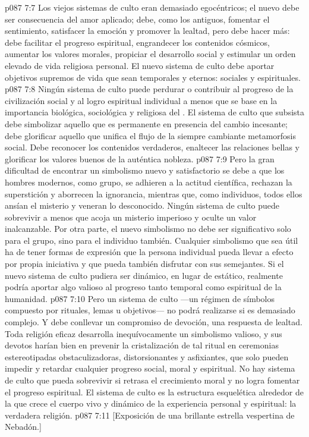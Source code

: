 \vs p087 7:7 Los viejos sistemas de culto eran demasiado egocéntricos; el nuevo debe ser consecuencia del amor aplicado; debe, como los antiguos, fomentar el sentimiento, satisfacer la emoción y promover la lealtad, pero debe hacer más: debe facilitar el progreso espiritual, engrandecer los contenidos cósmicos, aumentar los valores morales, propiciar el desarrollo social y estimular un orden elevado de vida religiosa personal. El nuevo sistema de culto debe aportar objetivos supremos de vida que sean temporales y eternos: sociales y espirituales.
\vs p087 7:8 Ningún sistema de culto puede perdurar o contribuir al progreso de la civilización social y al logro espiritual individual a menos que se base en la importancia biológica, sociológica y religiosa del . El sistema de culto que subsista debe simbolizar aquello que es permanente en presencia del cambio incesante; debe glorificar aquello que unifica el flujo de la siempre cambiante metamorfosis social. Debe reconocer los contenidos verdaderos, enaltecer las relaciones bellas y glorificar los valores buenos de la auténtica nobleza.
\vs p087 7:9 Pero la gran dificultad de encontrar un simbolismo nuevo y satisfactorio se debe a que los hombres modernos, como grupo, se adhieren a la actitud científica, rechazan la superstición y aborrecen la ignorancia, mientras que, como individuos, todos ellos ansían el misterio y veneran lo desconocido. Ningún sistema de culto puede sobrevivir a menos que acoja un misterio imperioso y oculte un valor inalcanzable. Por otra parte, el nuevo simbolismo no debe ser significativo solo para el grupo, sino para el individuo también. Cualquier simbolismo que sea útil ha de tener formas de expresión que la persona individual pueda llevar a efecto por propia iniciativa y que pueda también disfrutar con sus semejantes. Si el nuevo sistema de culto pudiera ser dinámico, en lugar de estático, realmente podría aportar algo valioso al progreso tanto temporal como espiritual de la humanidad.
\vs p087 7:10 Pero un sistema de culto ---un régimen de símbolos compuesto por rituales, lemas u objetivos--- no podrá realizarse si es demasiado complejo. Y debe conllevar un compromiso de devoción, una respuesta de lealtad. Toda religión eficaz desarrolla inequívocamente un simbolismo valioso, y sus devotos harían bien en prevenir la cristalización de tal ritual en ceremonias estereotipadas obstaculizadoras, distorsionantes y asfixiantes, que solo pueden impedir y retardar cualquier progreso social, moral y espiritual. No hay sistema de culto que pueda sobrevivir si retrasa el crecimiento moral y no logra fomentar el progreso espiritual. El sistema de culto es la estructura esquelética alrededor de la que crece el cuerpo vivo y dinámico de la experiencia personal y espiritual: la verdadera religión.
\vsetoff
\vs p087 7:11 [Exposición de una brillante estrella vespertina de Nebadón.]
